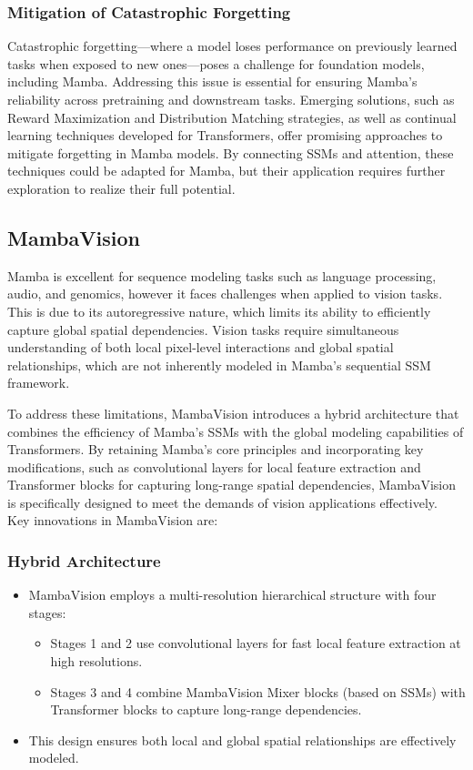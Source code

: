 \documentclass[12pt, conference, compsoc, onecolumn]{IEEEtran}
\begin{document}
	\subsubsection*{Mitigation of Catastrophic Forgetting}
	
	Catastrophic forgetting—where a model loses performance on previously learned tasks when exposed to new ones—poses a challenge for foundation models, including Mamba. Addressing this issue is essential for ensuring Mamba's reliability across pretraining and downstream tasks. Emerging solutions, such as Reward Maximization and Distribution Matching strategies, as well as continual learning techniques developed for Transformers, offer promising approaches to mitigate forgetting in Mamba models. By connecting SSMs and attention, these techniques could be adapted for Mamba, but their application requires further exploration to realize their full potential.
	
	\newpage
	\subsection{MambaVision}
	
	Mamba is excellent for sequence modeling tasks such as language processing, audio, and genomics, however it faces challenges when applied to vision tasks. This is due to its autoregressive nature, which limits its ability to efficiently capture global spatial dependencies. Vision tasks require simultaneous understanding of both local pixel-level interactions and global spatial relationships, which are not inherently modeled in Mamba's sequential SSM framework.
	
	To address these limitations, MambaVision \cite{hatamizadeh2024mambavision} introduces a hybrid architecture that combines the efficiency of Mamba's SSMs with the global modeling capabilities of Transformers. By retaining Mamba's core principles and incorporating key modifications, such as convolutional layers for local feature extraction and Transformer blocks for capturing long-range spatial dependencies, MambaVision is specifically designed to meet the demands of vision applications effectively.
	\\
	
	Key innovations in MambaVision are:
	\subsubsection*{Hybrid Architecture}
	\begin{itemize}
		\item MambaVision employs a multi-resolution hierarchical structure with four stages:
		\begin{itemize}
			\item Stages 1 and 2 use convolutional layers for fast local feature extraction at high resolutions.
			\item Stages 3 and 4 combine MambaVision Mixer blocks (based on SSMs) with Transformer blocks to capture long-range dependencies.
		\end{itemize}
		\item This design ensures both local and global spatial relationships are effectively modeled.
	\end{itemize}
	
\end{document}
